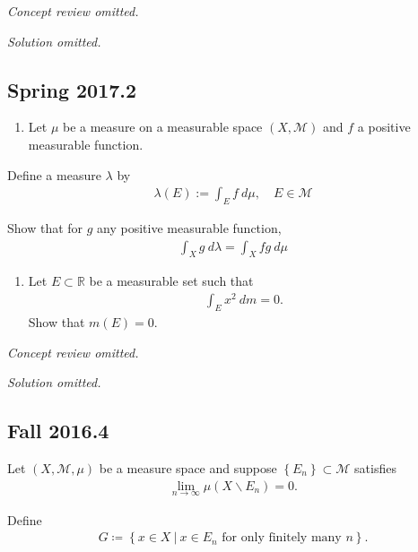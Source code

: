 \emph{Concept review omitted.}

\emph{Solution omitted.}

\hypertarget{spring-2017.2}{%
\subsection{Spring 2017.2}\label{spring-2017.2}}

\begin{enumerate}
\def\labelenumi{\alph{enumi}.}
\tightlist
\item
  Let \(\mu\) be a measure on a measurable space \((X, \mathcal M)\) and
  \(f\) a positive measurable function.
\end{enumerate}

Define a measure \(\lambda\) by
\begin{align*}
\lambda(E):=\int_{E} f ~d \mu, \quad E \in \mathcal{M}
\end{align*}

Show that for \(g\) any positive measurable function,
\begin{align*}
\int_{X} g ~d \lambda=\int_{X} f g ~d \mu
\end{align*}

\begin{enumerate}
\def\labelenumi{\alph{enumi}.}
\setcounter{enumi}{1}
\tightlist
\item
  Let \(E \subset {\mathbb{R}}\) be a measurable set such that
  \begin{align*}
  \int_{E} x^{2} ~d m=0.
  \end{align*}
  Show that \(m(E) = 0\).
\end{enumerate}

\emph{Concept review omitted.}

\emph{Solution omitted.}

\hypertarget{fall-2016.4}{%
\subsection{Fall 2016.4}\label{fall-2016.4}}

Let \((X, \mathcal M, \mu)\) be a measure space and suppose
\(\left\{{E_n}\right\} \subset \mathcal M\) satisfies
\begin{align*}
\lim _{n \rightarrow \infty} \mu\left(X \backslash E_{n}\right)=0.
\end{align*}

Define
\begin{align*}
G \coloneqq\left\{{x\in X {~\mathrel{\Big\vert}~}x\in E_n \text{ for only finitely many  } n}\right\}.
\end{align*}

